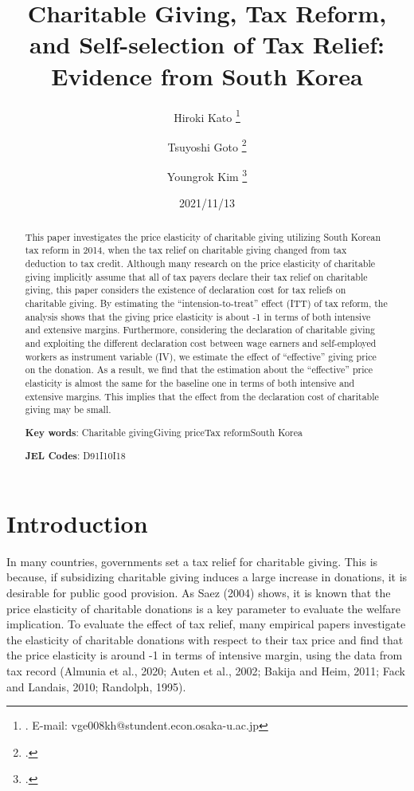 \documentclass[
  11pt,
  a4paper,
]{article}
\title{Charitable Giving, Tax Reform, and Self-selection of Tax Relief: Evidence from South Korea  }
\author{
    Hiroki Kato
  \thanks{. E-mail: vge008kh@stundent.econ.osaka-u.ac.jp  }
  \and
    Tsuyoshi Goto
  \thanks{.  }
  \and
    Youngrok Kim
  \thanks{.  }
  \and
  }
\date{2021/11/13}
\begin{document}
\begin{spacing}{1}
  \maketitle
\end{spacing}
\begin{spacing}{1}
  \begin{abstract}
    This paper investigates the price elasticity of charitable giving utilizing South Korean tax reform in 2014, when the tax relief on charitable giving changed from tax deduction to tax credit. Although many research on the price elasticity of charitable giving implicitly assume that all of tax payers declare their tax relief on charitable giving, this paper considers the existence of declaration cost for tax reliefs on charitable giving.
    By estimating the ``intension-to-treat'' effect (ITT) of tax reform, the analysis shows that the giving price elasticity is about -1 in terms of both intensive and extensive margins. Furthermore, considering the declaration of charitable giving and exploiting the different declaration cost between wage earners and self-employed workers as instrument variable (IV), we estimate the effect of ``effective'' giving price on the donation. As a result, we find that the estimation about the ``effective'' price elasticity is almost the same for the baseline one in terms of both intensive and extensive margins. This implies that the effect from the declaration cost of charitable giving may be small.
    
            \noindent
    \textbf{Key words}: Charitable givingGiving priceTax reformSouth Korea
        
        \noindent
    \textbf{JEL Codes}: D91I10I18
        
  \end{abstract}
\end{spacing}

\hypertarget{introduction}{%
\section{Introduction}\label{introduction}}

In many countries, governments set a tax relief for charitable giving. This is because, if subsidizing charitable giving induces a large increase in donations, it is desirable for public good provision. As Saez (2004) shows, it is known that the price elasticity of charitable donations is a key parameter to evaluate the welfare implication. To evaluate the effect of tax relief, many empirical papers investigate the elasticity of charitable donations with respect to their tax price and find that the price elasticity is around -1 in terms of intensive margin, using the data from tax record (Almunia et al., 2020; Auten et al., 2002; Bakija and Heim, 2011; Fack and Landais, 2010; Randolph, 1995).
\end{document}
